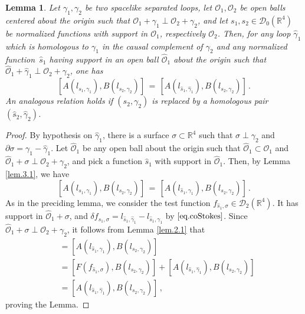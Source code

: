 \documentclass[11pt]{article}
\newtheorem{lemma}[theorem]{Lemma}
\numberwithin{equation}{section}
\newcommand{\RR}{{\mathbb R}}
\newcommand{\Dc}{{\mathcal{D}}}
\newcommand{\Oc}{{\mathcal{O}}}
\begin{document}
%
\begin{lemma}
\label{lem.3.2}
Let $\gamma_1,\gamma_2$ be two spacelike separated loops, 
let $\Oc_1,\Oc_2$  be open balls centered about the origin 
such that $\Oc_1 + \gamma_1 \perp \Oc_2 + \gamma_2$,  
and let $s_1,s_2 \in \Dc_0(\RR^4)$ be normalized  
functions with support in $\Oc_1$, respectively $\Oc_2$. 
Then, for any loop $\widehat \gamma_1$ which is homologous to 
$\gamma_1$ in the causal complement of $\gamma_2$
and any normalized function~$\widehat s_1$ 
having support in an open ball $\widehat \Oc_1$ 
about the origin such that $\widehat \Oc_1 + \widehat \gamma_1 
\perp \Oc_2 + \gamma_2$, one has 
%
$$
[ A(l_{s_1,\gamma_1})  , B(l_{s_2,\gamma_2}) ] 
\, = \,
[ A(l_{\widehat s_1,\widehat \gamma_1}) , B(l_{s_2,\gamma_2}) ] \, .
$$
%
An analogous relation holds if 
$(s_2, \gamma_2)$ is replaced by a homologous  
pair~$(\widehat s_2, \widehat \gamma_2)$.  
\end{lemma}
\begin{proof}
By hypothesis on $\widehat \gamma_1$,  
there is a surface $\sigma \subset \RR^4$ such that 
%
$\sigma \perp \gamma_2$ and 
$\partial \sigma = \gamma_1 - \widehat \gamma_1 $. 
Let $\widehat \Oc_1$ be any open ball
about the origin such that 
$\widehat \Oc_1 \subset \Oc_1$ and 
$\widehat \Oc_1 + \sigma \perp \Oc_2 + \gamma_2$, and pick  
a function $\widehat s_1$ with support in 
$\widehat \Oc_1$. Then, by Lemma \ref{lem.3.1}, we have 
$$
[ A(l_{s_1,\gamma_1})  , B(l_{s_2,\gamma_2}) ] 
\, = \,
[ A(l_{\widehat s_1,\gamma_1}) , B(l_{s_2,\gamma_2}) ] \, . 
$$
As in the preciding lemma, we consider the 
test function $f_{\widehat s_1,\sigma} \in \Dc_2(\RR^4)$. It has support 
in $\widehat \Oc_1 + \sigma$, and 
$\delta f_{\widehat s_1,\sigma} =   
l_{\widehat s_1, \widehat \gamma_1} - 
l_{\widehat s_1, \gamma_1}$ by  
$\eqref{eq.coStokes}$.
Since $\widehat \Oc_1 + \sigma\perp \Oc_2+\gamma_2$,  
it follows from Lemma \ref{lem.2.1} that   
%
\begin{align*}
[ A(l_{s_1,\gamma_1})  , B(l_{s_2,\gamma_2}) ] 
 & = 
[ A(l_{\widehat s_1,\gamma_1}) , B(l_{s_2,\gamma_2}) ] \\
& = 
[ F(f_{\widehat s_1,\sigma}) , B(l_{s_2,\gamma_2}) ] + 
[ A(l_{\widehat s_1, \widehat \gamma_1}) , B(l_{s_2,\gamma_2}) ]\\
 & = 
[ A(l_{\widehat s_1, \widehat \gamma_1}) , B(l_{s_2,\gamma_2}) ] \, ,
\end{align*}
%
proving the Lemma.
\end{proof}
\end{document}
